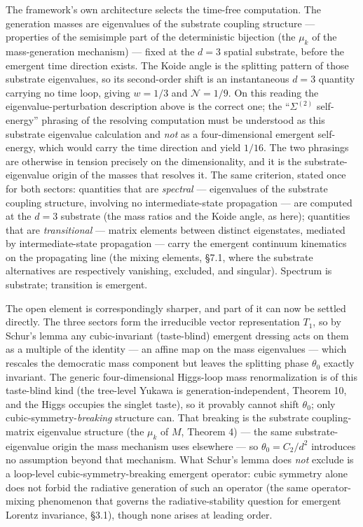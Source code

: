 \documentclass[
]{article}
\begin{document}
The framework's own architecture selects the time-free computation. The
generation masses are eigenvalues of the substrate coupling structure
--- properties of the semisimple part of the deterministic bijection
(the \(\mu_k\) of the mass-generation mechanism) --- fixed at the
\(d = 3\) spatial substrate, before the emergent time direction exists.
The Koide angle is the splitting pattern of those substrate eigenvalues,
so its second-order shift is an instantaneous \(d = 3\) quantity
carrying no time loop, giving \(w = 1/3\) and \(\mathcal{N} = 1/9\). On
this reading the eigenvalue-perturbation description above is the
correct one; the ``\(\Sigma^{(2)}\) self-energy'' phrasing of the
resolving computation must be understood as this substrate eigenvalue
calculation and \emph{not} as a four-dimensional emergent self-energy,
which would carry the time direction and yield \(1/16\). The two
phrasings are otherwise in tension precisely on the dimensionality, and
it is the substrate-eigenvalue origin of the masses that resolves it.
The same criterion, stated once for both sectors: quantities that are
\emph{spectral} --- eigenvalues of the substrate coupling structure,
involving no intermediate-state propagation --- are computed at the
\(d = 3\) substrate (the mass ratios and the Koide angle, as here);
quantities that are \emph{transitional} --- matrix elements between
distinct eigenstates, mediated by intermediate-state propagation ---
carry the emergent continuum kinematics on the propagating line (the
mixing elements, §7.1, where the substrate alternatives are respectively
vanishing, excluded, and singular). Spectrum is substrate; transition is
emergent.

The open element is correspondingly sharper, and part of it can now be
settled directly. The three sectors form the irreducible vector
representation \(T_1\), so by Schur's lemma any cubic-invariant
(taste-blind) emergent dressing acts on them as a multiple of the
identity --- an affine map on the mass eigenvalues --- which rescales
the democratic mass component but leaves the splitting phase
\(\theta_0\) exactly invariant. The generic four-dimensional Higgs-loop
mass renormalization is of this taste-blind kind (the tree-level Yukawa
is generation-independent, Theorem 10, and the Higgs occupies the
singlet taste), so it provably cannot shift \(\theta_0\); only
cubic-symmetry-\emph{breaking} structure can. That breaking is the
substrate coupling-matrix eigenvalue structure (the \(\mu_k\) of \(M\),
Theorem 4) --- the same substrate-eigenvalue origin the mass mechanism
uses elsewhere --- so \(\theta_0 = C_2/d^2\) introduces no assumption
beyond that mechanism. What Schur's lemma does \emph{not} exclude is a
loop-level cubic-symmetry-breaking emergent operator: cubic symmetry
alone does not forbid the radiative generation of such an operator (the
same operator-mixing phenomenon that governs the radiative-stability
question for emergent Lorentz invariance, §3.1), though none arises at
leading order.
\end{document}
